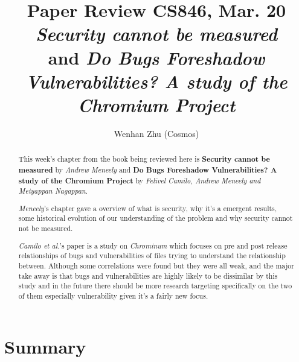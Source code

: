 \documentclass[sigconf]{acmart}
\begin{document}
\title{Paper Review CS846, Mar. 20\\
\textit{Security cannot be measured} \\
and \textit{Do Bugs Foreshadow Vulnerabilities? A study of the Chromium Project}
}

\author{Wenhan Zhu (Cosmos)}

\begin{abstract}

    This week's chapter from the book being reviewed here is {\bf Security cannot be measured} by {\it Andrew Meneely} and {\bf Do Bugs Foreshadow Vulnerabilities? A study of the Chromium Project} by {\it Felivel Camilo, Andrew Meneely and Meiyappan Nagappan}.

    {\it Meneely}'s chapter gave a overview of what is security, why it's a emergent results, some historical evolution of our understanding of the problem and why security cannot not be measured.

    {\it Camilo et al.}'s paper is a study on {\it Chrominum} which focuses on pre and post release relationships of bugs and vulnerabilities of files trying to understand the relationship between. Although some correlations were found but they were all weak, and the major take away is that bugs and vulnerabilities are highly likely to be dissimilar by this study and in the future there should be more research targeting specifically on the two of them especially vulnerability given it's a fairly new focus.


\end{abstract}


\maketitle

\section{Summary}
\end{document}
